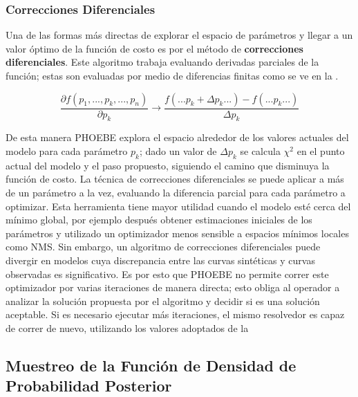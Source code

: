 \subsubsection{Correcciones Diferenciales} \label{intro:phoebe:correcciones_diferenciales}

Una de las formas más directas de explorar el espacio de parámetros y llegar a
un valor óptimo de la función de costo es por el método de \textbf{correcciones
diferenciales}. Este algoritmo trabaja evaluando derivadas parciales de la
función; estas son evaluadas por medio de diferencias finitas como se ve en la
.

\begin{eqfloat}[!ht]
	\centering
	\begin{equation}
		\frac{\partial f(p_1,...,p_k,...,p_n)}{\partial p_k} \rightarrow \frac{f(...p_k + \Delta p_k...) - f(...p_k...)}{\Delta p_k}
	\end{equation}
	\blankcaption
	\vspace{-0.4em}
	\label{ecuacionDiferenciasFinitas}
\end{eqfloat}

De esta manera PHOEBE explora el espacio alrededor de los valores actuales del
modelo para cada parámetro $p_k$; dado un valor de $\Delta p_k$ se calcula
$\chi^2$ en el punto actual del modelo y el paso propuesto, siguiendo el camino
que disminuya la función de costo. La técnica de correcciones diferenciales se
puede aplicar a más de un parámetro a la vez, evaluando la diferencia parcial
para cada parámetro a optimizar. Esta herramienta tiene mayor utilidad cuando el
modelo esté cerca del mínimo global, por ejemplo después obtener estimaciones
iniciales de los parámetros y utilizado un optimizador menos sensible a espacios
mínimos locales como NMS. Sin embargo, un algoritmo de correcciones
diferenciales puede divergir en modelos cuya discrepancia entre las curvas
sintéticas y curvas observadas es significativo. Es por esto que PHOEBE no
permite correr este optimizador por varias iteraciones de manera directa; esto
obliga al operador a analizar la solución propuesta por el algoritmo y decidir
si es una solución aceptable. Si es necesario ejecutar más iteraciones, el mismo
resolvedor es capaz de correr de nuevo, utilizando los valores adoptados de la

\subsection{Muestreo de la Función de Densidad de Probabilidad Posterior} \label{intro:phoebe:problema_inverso:muestreo}

